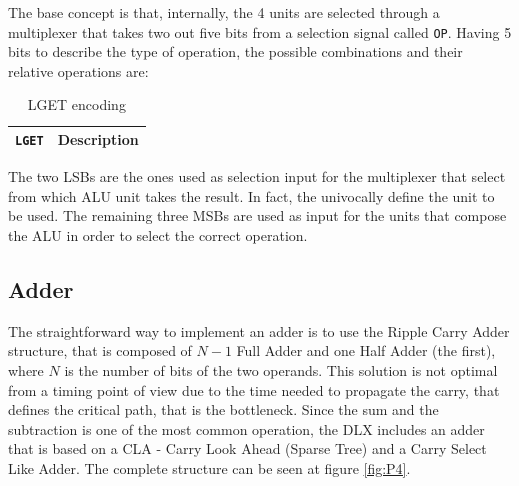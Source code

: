 The base concept is that, internally, the 4 units are selected through a multiplexer that takes two out five bits from a selection signal called \texttt{OP}. Having 5 bits to describe the type of operation, the possible combinations and their relative operations are:
\begin{table}[H]
	\centering
	\begin{tabular}{c | l}
		\texttt{LGET} & \textbf{Description}\\
		\hline
	
	\end{tabular}
	\caption{LGET encoding}
\end{table}

The two LSBs are the ones used as selection input for the multiplexer that select from which ALU unit takes the result. In fact, the univocally define the unit to be used. The remaining three MSBs are used as input for the units that compose the ALU in order to select the correct operation.

\subsection{Adder}
The straightforward way to implement an adder is to use the Ripple Carry Adder structure, that is composed of $N-1$ Full Adder and one Half Adder (the first), where $N$ is the number of bits of the two operands. This solution is not optimal from a timing point of view due to the time needed to propagate the carry, that defines the critical path, that is the bottleneck. \newline\newline
Since the sum and the subtraction is one of the most common operation, the DLX includes an adder that is based on a CLA - Carry Look Ahead (Sparse Tree) and a Carry Select Like Adder. The complete structure can be seen at figure \ref{fig:P4}.

